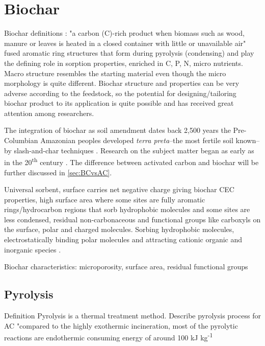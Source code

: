 
\section{Biochar}
Biochar definitions \citep{LehmannAndJoseph2015}:
"a carbon (C)-rich product when biomass such as wood, manure or leaves is heated in a closed container with little or unavailable air" \citep{LehmannAndJoseph2015} fused aromatic ring structures that form during pyrolysis (condensing) and play the defining role in sorption properties, enriched in C, P, N, micro nutrients. Macro structure resembles the starting material even though the micro morphology is quite different. Biochar structure and properties can be very adverse according to the feedstock, so the potential for designing/tailoring biochar product to its application is quite possible and has received great attention among researchers. 

The integration of biochar as soil amendment dates back 2,500 years the Pre-Columbian Amazonian peoples developed \textit{terra preta}--the most fertile soil known--by slash-and-char techniques \citep{Tindall2017,Ahmad2014}. Research on the subject matter began as early as in the 20\textsuperscript{th} century \citep{Retan1915}. The difference between activated carbon and biochar will be further discussed in \cref{sec:BCvsAC}. 

Universal sorbent, surface carries net negative charge giving biochar CEC properties, high surface area where some sites are fully aromatic rings/hydrocarbon regions that sorb hydrophobic molecules and some sites are less condensed, residual non-carbonaceous and functional groups like carboxyls on the surface, polar and charged molecules. Sorbing hydrophobic molecules, electrostatically binding polar molecules and attracting cationic organic and inorganic species \citep{Ahmad2014,vanloon2017Ch14}. 

Biochar characteristics: microporosity, surface area, residual functional groups

\subsection{Pyrolysis}
Definition 
Pyrolysis is a thermal treatment method. 
Describe pyrolysis process for AC
"compared to the highly exothermic incineration, most of the pyrolytic reactions are endothermic consuming energy of around 100 kJ kg\textsuperscript{-1}

